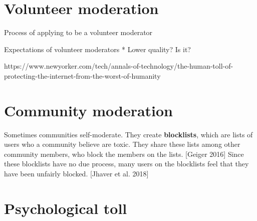 \documentclass[class=book, crop=false]{standalone}
\providecommand{\keyterm}[1]{\textbf{#1}\marginnote{\scriptsize \textbf{#1}}}
\begin{document}
\section{Volunteer moderation}

Process of applying to be a volunteer moderator

Expectations of volunteer moderators
 * Lower quality? Is it?

https://www.newyorker.com/tech/annals-of-technology/the-human-toll-of-protecting-the-internet-from-the-worst-of-humanity\\

\section{Community moderation}

Sometimes communities self-moderate. They create \keyterm{blocklists}, which are lists of users who a community believe are toxic. They share these lists among other community members, who block the members on the lists. [Geiger 2016] Since these blocklists have no due process, many users on the blocklists feel that they have been unfairly blocked. [Jhaver et al. 2018]

\section{Psychological toll}
\end{document}

